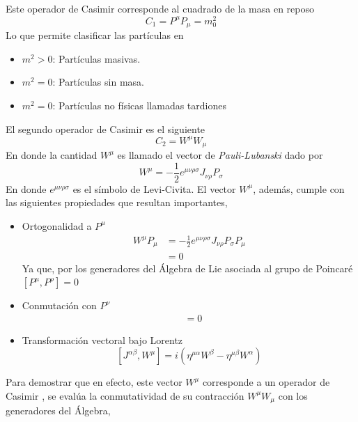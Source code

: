 \documentclass[12pt,letterpaper]{article}
\begin{document}
Este operador de Casimir corresponde al cuadrado de la masa en reposo
\begin{equation}
  C_1 = P^\mu P_\mu = m_0^2
 \end{equation}
 Lo que permite clasificar las partículas en
 \begin{itemize}
   \item $m^2>0$: Partículas masivas.
   \item $m^2=0$: Partículas sin masa.
   \item $m^2=0$: Partículas no físicas llamadas tardiones
 \end{itemize}
El segundo operador de Casimir es el siguiente
\begin{equation}
  C_2 = W^\mu W_\mu
 \end{equation}
 En donde la cantidad $W^\mu$ es llamado el vector de \emph{Pauli-Lubanski} \cite{weinberg-v1} dado por
 \begin{equation}
   W^\mu = -\frac{1}{2}e^{\mu\nu\rho\sigma} J_{\nu\rho} P_\sigma
  \end{equation}
  En donde $e^{\mu\nu\rho\sigma}$ es el símbolo de Levi-Civita. El vector $W^\mu$, además, cumple con las siguientes propiedades que resultan importantes,
  \begin{itemize}
    \item Ortogonalidad a $P^\mu$
    \begin{align*}
      W^\mu P_\mu & = - \frac{1}{2}e^{\mu\nu\rho\sigma} J_{\nu\rho} P_\sigma P_\mu \\
      & = 0
    \end{align*}
    Ya que, por los generadores del Álgebra de Lie asociada al grupo de Poincaré $[P^\mu,P^\rho]=0$
    \item Conmutación con $P^\nu$
    \begin{align*}
      [P^\nu,W^\mu] & = 0
    \end{align*}
    \item Transformación vectoral bajo Lorentz
    \begin{equation*}
      \left[ J^{\alpha \beta}, W^\mu \right] = i \left( \eta^{\mu\alpha} W^\beta - \eta^{\mu\beta} W^\alpha \right)
    \end{equation*}
  \end{itemize}
    Para demostrar que en efecto, este vector $W^\mu$ corresponde a un operador de Casimir \cite{weinberg-v1}, se evalúa la conmutatividad de su contracción $W^\mu W_\mu$ con los generadores del Álgebra, 
\end{document}

